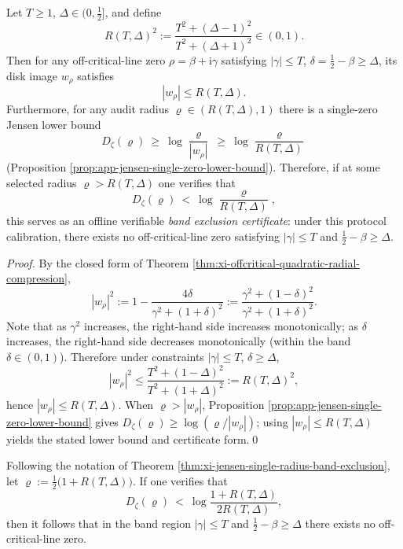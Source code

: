 \begin{theorem}\label{thm:xi-jensen-single-radius-band-exclusion}
Let \(T\ge 1\), \(\Delta\in(0,\tfrac12]\), and define
\[
  R(T,\Delta)^2:=\frac{T^2+(\Delta-1)^2}{T^2+(\Delta+1)^2}\in(0,1).
\]
Then for any off-critical-line zero \(\rho=\beta+\mathrm{i}\gamma\) satisfying \(|\gamma|\le T\), \(\delta=\tfrac12-\beta\ge\Delta\), its disk image \(w_\rho\) satisfies
\[
  |w_\rho|\le R(T,\Delta).
\]
Furthermore, for any audit radius \(\varrho\in(R(T,\Delta),1)\) there is a single-zero Jensen lower bound
\[
  D_\zeta(\varrho)\ \ge\ \log\frac{\varrho}{|w_\rho|}\ \ge\ \log\frac{\varrho}{R(T,\Delta)}
\]
(Proposition \ref{prop:app-jensen-single-zero-lower-bound}).
Therefore, if at some selected radius \(\varrho>R(T,\Delta)\) one verifies that
\[
  D_\zeta(\varrho)\ <\ \log\frac{\varrho}{R(T,\Delta)},
\]
this serves as an offline verifiable \emph{band exclusion certificate}: under this protocol calibration, there exists no off-critical-line zero satisfying \(|\gamma|\le T\) and \(\tfrac12-\beta\ge\Delta\).
\end{theorem}

\begin{proof}
By the closed form of Theorem \ref{thm:xi-offcritical-quadratic-radial-compression},
\[
|w_\rho|^2
:=1-\frac{4\delta}{\gamma^2+(1+\delta)^2}
:=\frac{\gamma^2+(1-\delta)^2}{\gamma^2+(1+\delta)^2}.
\]
Note that as \(\gamma^2\) increases, the right-hand side increases monotonically; as \(\delta\) increases, the right-hand side decreases monotonically (within the band \(\delta\in(0,1)\)).
Therefore under constraints \(|\gamma|\le T\), \(\delta\ge\Delta\),
\[
|w_\rho|^2
\le \frac{T^2+(1-\Delta)^2}{T^2+(1+\Delta)^2}
:=R(T,\Delta)^2,
\]
hence \(|w_\rho|\le R(T,\Delta)\).
When \(\varrho>|w_\rho|\), Proposition \ref{prop:app-jensen-single-zero-lower-bound} gives
\(
D_\zeta(\varrho)\ge \log(\varrho/|w_\rho|)
\); using \(|w_\rho|\le R(T,\Delta)\) yields the stated lower bound and certificate form.\qed
\end{proof}

\begin{corollary}[Explicit single-point certificate taking \texorpdfstring{$\varrho=\tfrac12(1+R(T,\Delta))$}{varrho=(1+R)/2}]\label{cor:xi-jensen-single-radius-band-exclusion-midradius}
Following the notation of Theorem \ref{thm:xi-jensen-single-radius-band-exclusion}, let
\(
\varrho:=\tfrac12\bigl(1+R(T,\Delta)\bigr)
\).
If one verifies that
\[
  D_\zeta(\varrho)\ <\ \log\frac{1+R(T,\Delta)}{2R(T,\Delta)},
\]
then it follows that in the band region \(|\gamma|\le T\) and \(\tfrac12-\beta\ge\Delta\) there exists no off-critical-line zero.
\end{corollary}

